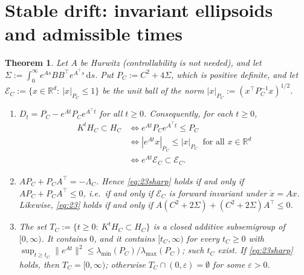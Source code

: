\documentclass[11pt]{amsart}
\numberwithin{equation}{section}
\newtheorem{theorem}{Theorem}[section]
\theoremstyle{definition}
\theoremstyle{remark}
\newcommand{\R}{\mathbb{R}}
\newcommand{\dd}{\,\mathrm{d}}
\newcommand{\tp}{\top}
\begin{document}
\section{Stable drift: invariant ellipsoids and admissible times}\label{sec:geometry}

\begin{theorem}\label{thm:D}
Let $A$ be Hurwitz (controllability is not needed), and let $\Sigma:=\int_0^\infty e^{As}BB^\tp e^{A^\tp s}\dd s$.
Put $P_C:=C^2+4\Sigma$, which is positive definite, and let $\mathcal E_C:=\{x\in\R^d:\ |x|_{P_C}\le1\}$ be the unit
ball of the norm $|x|_{P_C}:=(x^\tp P_C^{-1}x)^{1/2}$.
\begin{enumerate}
\item[(a)] $D_t=P_C-e^{At}P_Ce^{A^\tp t}$ for all $t\ge0$. Consequently, for each $t\ge0$,
\begin{align*}
K^tH_C\subset H_C
&\iff e^{At}P_Ce^{A^\tp t}\le P_C\\
&\iff |e^{At}x|_{P_C}\le|x|_{P_C}\ \text{ for all }x\in\R^d\\
&\iff e^{At}\mathcal E_C\subset\mathcal E_C .
\end{align*}
\item[(b)] $AP_C+P_CA^\tp=-\Lambda_C$. Hence \eqref{eq:23sharp} holds if and only if $AP_C+P_CA^\tp\le0$, i.e.\ if
and only if $\mathcal E_C$ is forward invariant under $\dot x=Ax$. Likewise, \eqref{eq:23} holds if and only if
$A(C^2+2\Sigma)+(C^2+2\Sigma)A^\tp\le0$.
\item[(c)] The set $T_C:=\{t\ge0:\ K^tH_C\subset H_C\}$ is a closed additive subsemigroup of $[0,\infty)$. It
contains $0$, and it contains $[t_C,\infty)$ for every $t_C\ge0$ with
$\sup_{t\ge t_C}\|e^{At}\|^2\le\lambda_{\min}(P_C)/\lambda_{\max}(P_C)$; such $t_C$ exist. If \eqref{eq:23sharp} holds,
then $T_C=[0,\infty)$; otherwise $T_C\cap(0,\varepsilon)=\emptyset$ for some $\varepsilon>0$.
\end{enumerate}
\end{theorem}
\end{document}
